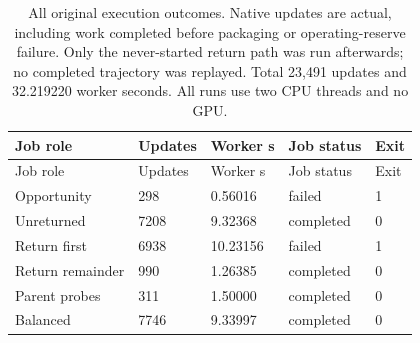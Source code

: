 \begin{longtable}{lllll}
\caption{All original execution outcomes. Native updates are actual, including work completed before packaging or operating-reserve failure. Only the never-started return path was run afterwards; no completed trajectory was replayed. Total 23,491 updates and 32.219220 worker seconds. All runs use two CPU threads and no GPU.}\label{tab:local-history-jobs}\\
\toprule
Job role & Updates & Worker s & Job status & Exit \\
\midrule
\endfirsthead
\toprule
Job role & Updates & Worker s & Job status & Exit \\
\midrule
\endhead
Opportunity & 298 & 0.56016 & failed & 1 \\
Unreturned & 7208 & 9.32368 & completed & 0 \\
Return first & 6938 & 10.23156 & failed & 1 \\
Return remainder & 990 & 1.26385 & completed & 0 \\
Parent probes & 311 & 1.50000 & completed & 0 \\
Balanced & 7746 & 9.33997 & completed & 0 \\
\bottomrule
\end{longtable}
\endgroup
